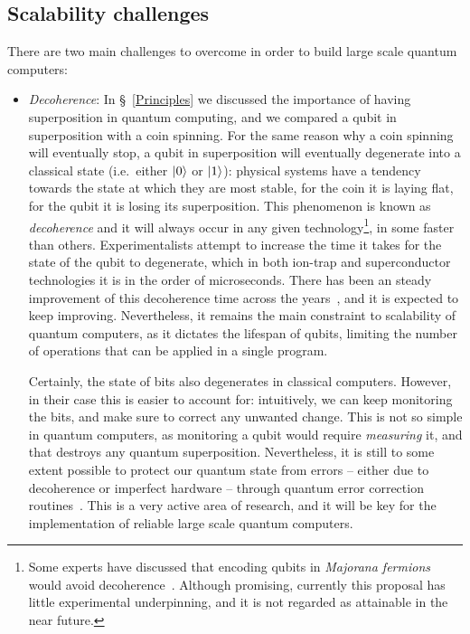\subsection{Scalability challenges}
\label{Challenges}

There are two main challenges to overcome in order to build large scale quantum computers:

\begin{itemize}

  \item \textit{Decoherence}: In \S~\ref{Principles} we discussed the importance of having superposition in quantum computing, and we compared a qubit in superposition with a coin spinning. For the same reason why a coin spinning will eventually stop, a qubit in superposition will eventually degenerate into a classical state (i.e.\ either \(\vert 0 \rangle\) or \(\vert 1 \rangle\)): physical systems have a tendency towards the state at which they are most stable, for the coin it is laying flat, for the qubit it is losing its superposition. This phenomenon is known as \textit{decoherence} and it will always occur in any given technology\footnote{Some experts have discussed that encoding qubits in \textit{Majorana fermions} would avoid decoherence~\cite{Majorana}. Although promising, currently this proposal has little experimental underpinning, and it is not regarded as attainable in the near future.}, in some faster than others. Experimentalists attempt to increase the time it takes for the state of the qubit to degenerate, which in both ion-trap and superconductor technologies it is in the order of microseconds. There has been an steady improvement of this decoherence time across the years~\cite{SurveyDecoherence}, and it is expected to keep improving. Nevertheless, it remains the main constraint to scalability of quantum computers, as it dictates the lifespan of qubits, limiting the number of operations that can be applied in a single program. 

  Certainly, the state of bits also degenerates in classical computers. However, in their case this is easier to account for: intuitively, we can keep monitoring the bits, and make sure to correct any unwanted change. This is not so simple in quantum computers, as monitoring a qubit would require \textit{measuring} it, and that destroys any quantum superposition. Nevertheless, it is still to some extent possible to protect our quantum state from errors -- either due to decoherence or imperfect hardware -- through quantum error correction routines~\cite{QuantumErrorCorrection}. This is a very active area of research, and it will be key for the implementation of reliable large scale quantum computers.



\end{itemize}
